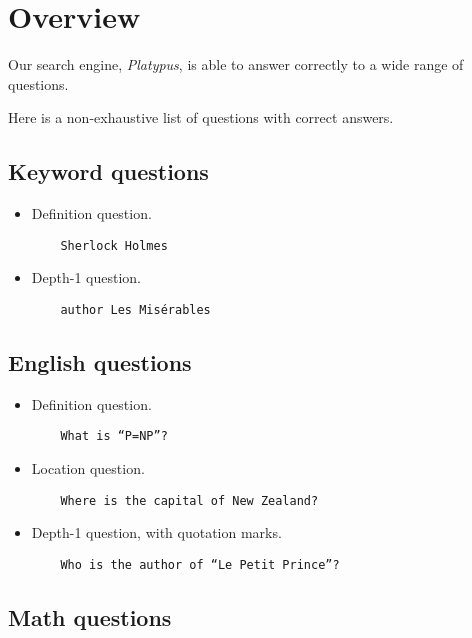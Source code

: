 \section{Overview}

Our search engine, \emph{Platypus}, is able to answer correctly to a wide range
of questions.

Here is a non-exhaustive list of questions with correct answers.

\subsection{Keyword questions}

\begin{itemize}
    \item Definition question.
    \begin{verbatim}
    Sherlock Holmes
    \end{verbatim}

    \item Depth-1 question.
    \begin{verbatim}
    author Les Misérables
    \end{verbatim}
\end{itemize}

\subsection{English questions}

\begin{itemize}
    \item Definition question.
    \begin{verbatim}
    What is “P=NP”?
    \end{verbatim}

    \item Location question.
    \begin{verbatim}
    Where is the capital of New Zealand?
    \end{verbatim}

    \item Depth-1 question, with quotation marks.
    \begin{verbatim}
    Who is the author of “Le Petit Prince”?
    \end{verbatim}
\end{itemize}

\subsection{Math questions}

